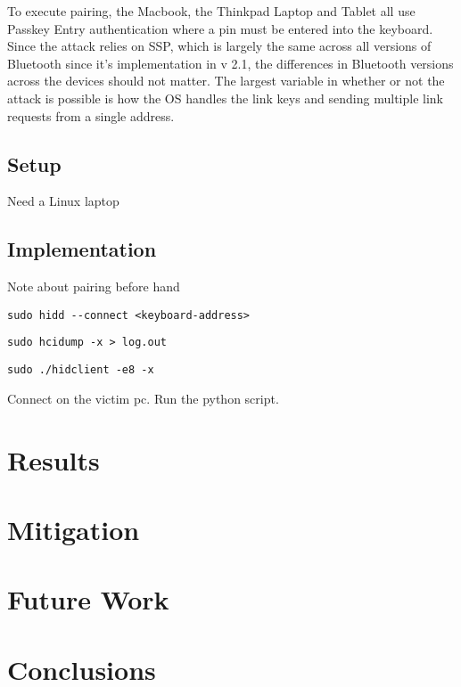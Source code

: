 \documentclass{acm_proc_article-sp}
\begin{document}
To execute pairing, the Macbook, the Thinkpad Laptop and Tablet all use Passkey Entry authentication where a pin must be entered into the keyboard. Since the attack relies on SSP, which is largely the same across all versions of Bluetooth since it's implementation in v 2.1, the differences in Bluetooth versions across the devices should not matter. The largest variable in whether or not the attack is possible is how the OS handles the link keys and sending multiple link requests from a single address. 

\subsection{Setup}
Need a Linux laptop

\subsection{Implementation}
Note about pairing before hand
\begin{verbatim}
sudo hidd --connect <keyboard-address>
\end{verbatim}

\begin{verbatim}
sudo hcidump -x > log.out
\end{verbatim}

\begin{verbatim}
sudo ./hidclient -e8 -x
\end{verbatim}

Connect on the victim pc.
Run the python script.

\section{Results}

\section{Mitigation}
\section{Future Work}
\section{Conclusions}

%


\balancecolumns
\end{document}
